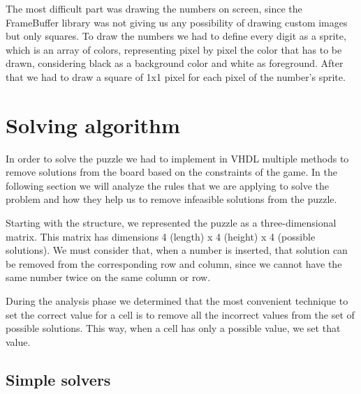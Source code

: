 \documentclass[12pt]{report}
\begin{document}
The most difficult part was drawing the numbers on screen, since the
FrameBuffer library was not giving us any possibility of drawing custom
images but only squares. To draw the numbers we had to define every digit
as a sprite, which is an array of colors, representing pixel by pixel the
color that has to be drawn, considering black as a background color and
white as foreground. After that we had to draw a square of 1x1 pixel for
each pixel of the number's sprite.

\chapter*{Solving algorithm}

In order to solve the puzzle we had to implement in VHDL multiple methods
to remove solutions from the board based on the constraints of the game. In
the following section we will analyze the rules that we are applying to
solve the problem and how they help us to remove infeasible solutions from
the puzzle.

Starting with the structure, we represented the puzzle as
a three-dimensional matrix. This matrix has dimensions 4 (length)
x 4 (height) x 4 (possible solutions). We must consider that, when
a number is inserted, that solution can be removed from the corresponding
row and column, since we cannot have the same number twice on the same
column or row.

During the analysis phase we determined that the most convenient technique
to set the correct value for a cell is to remove all the incorrect values
from the set of possible solutions. This way, when a cell has only
a possible value, we set that value.

\section*{Simple solvers}
\end{document}
